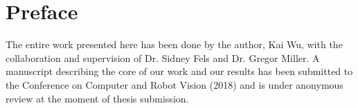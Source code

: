 
\chapter{Preface}

The entire work presented here has been done by the author, Kai Wu, with the collaboration and supervision of Dr. Sidney Fels and Dr. Gregor Miller. A manuscript describing the core of our work and our results has been submitted to the Conference on Computer and Robot Vision (2018) and is under anonymous review at the moment of thesis submission.
